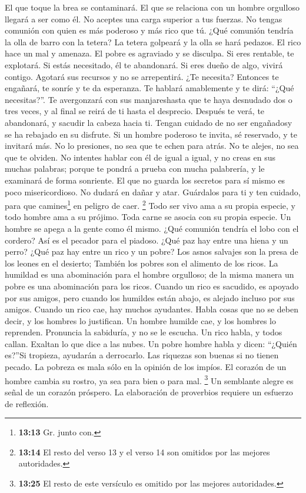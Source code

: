  El que toque la brea se contaminará. El que se relaciona
con un hombre orgulloso llegará a ser como él.  No aceptes
una carga superior a tus fuerzas. No tengas comunión con quien es más
poderoso y más rico que tú. ¿Qué comunión tendría la olla de barro con
la tetera? La tetera golpeará y la olla se hará pedazos. 
El rico hace un mal y amenaza. El pobre es agraviado y se disculpa.
 Si eres rentable, te explotará. Si estás necesitado, él
te abandonará.  Si eres dueño de algo, vivirá contigo.
Agotará sus recursos y no se arrepentirá.  ¿Te necesita?
Entonces te engañará, te sonríe y te da esperanza. Te hablará
amablemente y te dirá: ``¿Qué necesitas?''.  Te
avergonzará con sus manjareshasta que te haya desnudado dos o tres
veces, y al final se reirá de ti hasta el desprecio. Después te verá, te
abandonará, y sacudir la cabeza hacia ti.  Tengan cuidado
de no ser engañadosy se ha rebajado en su disfrute.  Si un
hombre poderoso te invita, sé reservado, y te invitará más.
 No lo presiones, no sea que te echen para atrás. No te
alejes, no sea que te olviden.  No intentes hablar con él
de igual a igual, y no creas en sus muchas palabras; porque te pondrá a
prueba con mucha palabrería, y le examinará de forma sonriente.
 El que no guarda los secretos para sí mismo es poco
misericordioso. No dudará en dañar y atar.  Guárdalos
para ti y ten cuidado, para que camines\footnote{\textbf{13:13} Gr.
  junto con.} en peligro de caer.  \footnote{\textbf{13:14}
  El resto del verso 13 y el verso 14 son omitidos por las mejores
  autoridades.}  Todo ser vivo ama a su propia especie, y
todo hombre ama a su prójimo.  Toda carne se asocia con
su propia especie. Un hombre se apega a la gente como él mismo.
 ¿Qué comunión tendría el lobo con el cordero? Así es el
pecador para el piadoso.  ¿Qué paz hay entre una hiena y
un perro? ¿Qué paz hay entre un rico y un pobre?  Los
asnos salvajes son la presa de los leones en el desierto; También los
pobres son el alimento de los ricos.  La humildad es una
abominación para el hombre orgulloso; de la misma manera un pobre es una
abominación para los ricos.  Cuando un rico es sacudido,
es apoyado por sus amigos, pero cuando los humildes están abajo, es
alejado incluso por sus amigos.  Cuando un rico cae, hay
muchos ayudantes. Habla cosas que no se deben decir, y los hombres lo
justifican. Un hombre humilde cae, y los hombres lo reprenden. Pronuncia
la sabiduría, y no se le escucha.  Un rico habla, y todos
callan. Exaltan lo que dice a las nubes. Un pobre hombre habla y dicen:
``¿Quién es?''Si tropieza, ayudarán a derrocarlo.  Las
riquezas son buenas si no tienen pecado. La pobreza es mala sólo en la
opinión de los impíos.  El corazón de un hombre cambia su
rostro, ya sea para bien o para mal. \footnote{\textbf{13:25} El resto
  de este versículo es omitido por las mejores autoridades.}
 Un semblante alegre es señal de un corazón próspero. La
elaboración de proverbios requiere un esfuerzo de reflexión.

